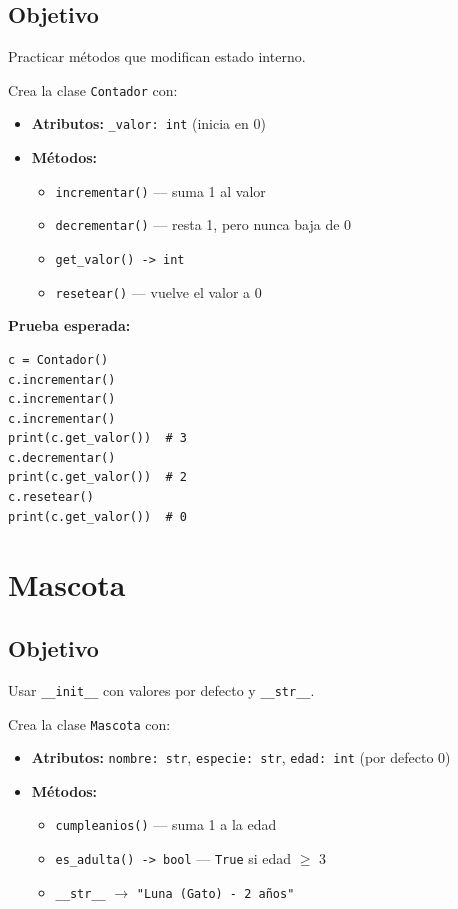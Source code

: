 \documentclass[11pt,letterpaper]{article}
\begin{document}
\subsection{Objetivo} Practicar métodos que modifican estado interno.

Crea la clase \texttt{Contador} con:
\begin{itemize}[nosep]
  \item \textbf{Atributos:} \texttt{\_valor: int} (inicia en 0)
  \item \textbf{Métodos:}
  \begin{itemize}[nosep]
    \item \texttt{incrementar()} --- suma 1 al valor
    \item \texttt{decrementar()} --- resta 1, pero nunca baja de 0
    \item \texttt{get\_valor() -> int}
    \item \texttt{resetear()} --- vuelve el valor a 0
  \end{itemize}
\end{itemize}

\textbf{Prueba esperada:}
\begin{lstlisting}
c = Contador()
c.incrementar()
c.incrementar()
c.incrementar()
print(c.get_valor())  # 3
c.decrementar()
print(c.get_valor())  # 2
c.resetear()
print(c.get_valor())  # 0
\end{lstlisting}

\section{Mascota}
\subsection{Objetivo} Usar \texttt{\_\_init\_\_} con valores por defecto y \texttt{\_\_str\_\_}.

Crea la clase \texttt{Mascota} con:
\begin{itemize}[nosep]
  \item \textbf{Atributos:} \texttt{nombre: str}, \texttt{especie: str}, \texttt{edad: int} (por defecto 0)
  \item \textbf{Métodos:}
  \begin{itemize}[nosep]
    \item \texttt{cumpleanios()} --- suma 1 a la edad
    \item \texttt{es\_adulta() -> bool} --- \texttt{True} si edad $\geq$ 3
    \item \texttt{\_\_str\_\_} $\to$ \texttt{"Luna (Gato) - 2 años"}
  \end{itemize}
\end{itemize}
\end{document}
